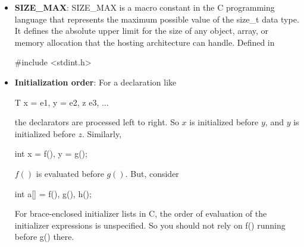\documentclass{report}
\begin{document}
\begin{itemize}
\begin{cppcode}
{                    union {
                        int i;
                        double d;
                        char* s;
                    } as;
                };
            \end{cppcode}
            \bigbreak \noindent 
            The kind field tells you which union member is currently valid.
            \item \textbf{SIZE\_MAX}: SIZE\_MAX is a macro constant in the C programming language that represents the maximum possible value of the size\_t data type. It defines the absolute upper limit for the size of any object, array, or memory allocation that the hosting architecture can handle.
                \bigbreak \noindent 
                Defined in
                \bigbreak \noindent 
                \begin{cppcode}
                #include <stdint.h>
                \end{cppcode}
            \item \textbf{Initialization order}: For a declaration like
                \bigbreak \noindent 
                \begin{cppcode}
                T x = e1, y = e2, z e3, ...
                \end{cppcode}
                \bigbreak \noindent 
                the declarators are processed left to right. So $x$ is initialized before $y$, and $y$ is initialized before $z$.
                \bigbreak \noindent 
                Similarly,
                \bigbreak \noindent 
                \begin{cppcode}
                int x = f(), y = g();
                \end{cppcode}
                \bigbreak \noindent 
                $f()$ is evaluated before $g()$. But, consider
                \bigbreak \noindent 
                \begin{cppcode}
                    int a[] = {f(), g(), h()};
                \end{cppcode}
                \bigbreak \noindent 
                For brace-enclosed initializer lists in C, the order of evaluation of the initializer expressions is unspecified. So you should not rely on f() running before g() there.


        \end{itemize}

        \pagebreak 
\end{document}
